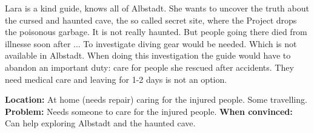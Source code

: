 \begin{npcBox}[title=Lara continued]
    
    \begin{stressSection}
    \end{stressSection}
    \begin{tabularx}{\textwidth}{ XX }
    \end{tabularx}
    
    \begin{consequences}
    \item {}
    \item {}
    \item {}
    \end{consequences}
    
    \begin{npcDescription}
    Lara is a kind guide, knows all of Albstadt. She wants to uncover the truth about the cursed and haunted cave, the so called secret site, where the Project drops the poisonous garbage. It is not really haunted. But people going there died from illnesse soon after ...
    To investigate diving gear would be needed. Which is not available in Albstadt.
    When doing this investigation the guide would have to abandon an important duty: care for people she rescued after accidents. They need medical care and leaving for 1-2 days is not an option.

    \textbf{Location:} At home (needs repair) caring for the injured people. Some travelling.
    \textbf{Problem:} Needs someone to care for the injured people. 
    \textbf{When convinced:} Can help exploring Albstadt and the haunted cave.
    \end{npcDescription}
    
\end{npcBox}


